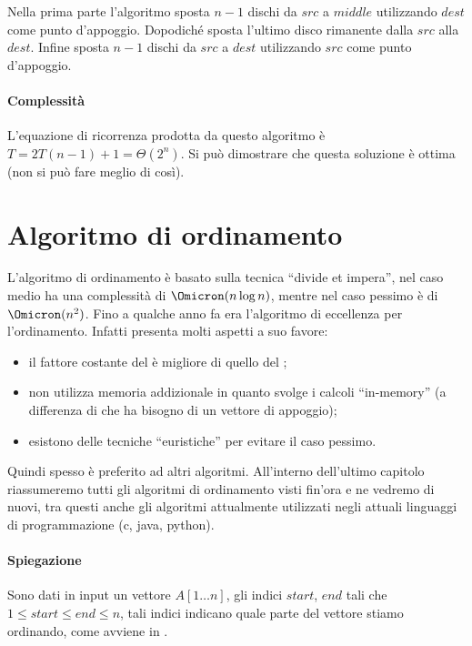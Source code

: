 Nella prima parte l'algoritmo sposta \(n-1\) dischi da \(src\) a \(middle\) utilizzando \(dest\) come punto d'appoggio.
Dopodiché sposta l'ultimo disco rimanente dalla \(src\) alla \(dest\).
Infine sposta \(n-1\) dischi da \(src\) a \(dest\) utilizzando \(src\) come punto d'appoggio.

\paragraph{Complessità}
L'equazione di ricorrenza prodotta da questo algoritmo è \(T = 2T(n-1) + 1 = \Theta(2^n)\).
Si può dimostrare che questa soluzione è ottima (non si può fare meglio di così).

\section{Algoritmo di ordinamento}

L'algoritmo di ordinamento \quickSort è basato sulla tecnica \enquote{divide et impera}, nel caso medio ha una complessità di \(\Omicron(n \log n)\), mentre nel caso pessimo è di \(\Omicron(n^2)\).
Fino a qualche anno fa era l'algoritmo di eccellenza per l'ordinamento.
Infatti presenta molti aspetti a suo favore:
\begin{itemize}
	\item il fattore costante del \quickSort è migliore di quello del \mergeSort;
	\item non utilizza memoria addizionale in quanto svolge i calcoli \enquote{in-memory} (a differenza di \mergeSort che ha bisogno di un vettore di appoggio);
	\item esistono delle tecniche \enquote{euristiche} per evitare il caso pessimo.
\end{itemize}
Quindi spesso è preferito ad altri algoritmi.
All'interno dell'ultimo capitolo riassumeremo tutti gli algoritmi di ordinamento visti fin'ora e ne vedremo di nuovi, tra questi anche gli algoritmi attualmente utilizzati negli attuali linguaggi di programmazione (c, java, python).

\paragraph{Spiegazione}
Sono dati in input un vettore \(A[1 \dots n]\), gli indici \(start\), \(end\) tali che \(1 \leqslant start \leqslant end \leqslant n\), tali indici indicano quale parte del vettore stiamo ordinando, come avviene in \mergeSort.

